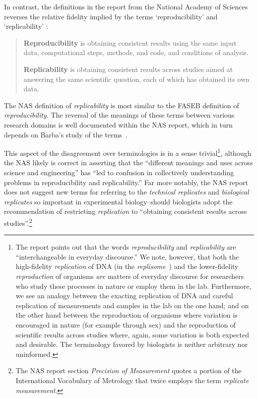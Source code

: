  In contrast, the definitions in the report from the National Academy of Sciences reverses the relative
	 fidelity implied by the terms `reproducibility' and `replicability' \cite[p.4]{committeeonreproducibilityandreplicabilityinscience2019reproducibility}: 
\begin{quote}
	\textbf{Reproducibility} is obtaining consistent results using the same input data, computational
	steps, methods, and code, and conditions of analysis.  \medskip

	\textbf{Replicability} is obtaining consistent results across studies aimed at answering the same
	scientific question, each of which has obtained its own data.
\end{quote}
      
The NAS definition of \emph{replicability} is most similar to the FASEB definition of \emph{reproducibility}.
The reversal of the meanings of these terms between various research domains is well documented within the NAS report, 
	which in turn depends on Barba's study of the terms~\cite{barba2018terminologies}.

This aspect of the disagreement over terminologies is in a sense trivial\footnote{
	The report points out that the words \emph{reproducibility} and \emph{replicability} are 
		``interchangeable in everyday discourse.''
	We note, however, that both the high-fidelity \emph{replication} of DNA (in the \emph{replisome}~\cite{spenkelink_recycling_2019}) 
		and the lower-fidelity \emph{reproduction}
		of organisms \emph{are} matters of everyday discourse for researchers who study these processes in nature or employ them in the lab.
		Furthermore, we see an analogy between the exacting replication of DNA and careful replication of measurements and samples
		in the lab on the one hand; and on the other hand between the reproduction of organisms where variation is encouraged in nature
		(for example through sex) and the reproduction of scientific results across studies where, again, some variation is both 
		expected and desirable. The terminology favored by biologists is neither arbitrary nor uninformed.}, although the NAS likely is correct in  
	asserting that the ``different meanings and uses across science and engineering'' has ``led to confusion in collectively 
	understanding problems in reproducibility and replicability.''
Far more notably, the NAS report does not suggest new terms for referring to the \emph{technical replicates} 
	and  \emph{biological replicates} so important in experimental biology--should biologists adopt the recommendation 
	of restricting \emph{replication} to ``obtaining consistent results across studies''.\footnote{
		The NAS report section \emph{Precision of Measurement} quotes a portion of the International Vocabulary of
		Metrology that twice employs the term \emph{replicate measurement}.
	}


